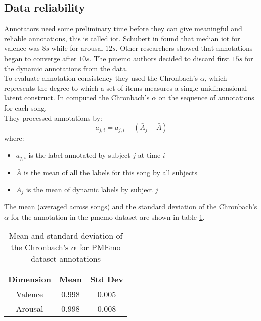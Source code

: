 \subsection{Data reliability}
Annotators need some preliminary time before they can give meaningful and reliable annotations, this is called \gls{iot}. Schubert in \cite{schubert2013reliability} found that median \gls{iot} for valence was $8s$ while for arousal $12s$. Other researchers showed that annotations began to converge after $10s$. The \gls{pmemo} authors decided to discard first $15s$ for the dynamic annotations from the data.
\\ \indent
To evaluate annotation consistency they used the Chronbach's $\alpha$, which represents the degree to which a set of items measures a single unidimensional latent construct. In \cite{zhang2018pmemo} computed the Chronbach's $\alpha$ on the sequence of annotations for each song.
\\
They processed annotations by:
\begin{equation}
	a_{j,i}=a_{j,i}+(\bar{A}_j-\bar{A})
\end{equation}
where:
\begin{itemize}
	\item $a_{j,i}$ is the label annotated by subject $j$ at time $i$
	\item $\bar{A}$ is the mean of all the labels for this song by all subjects
	\item $\bar{A}_j$ is the mean of dynamic labels by subject $j$
\end{itemize}
The mean (averaged across songs) and the standard deviation of the Chronbach's $\alpha$ for the annotation in the \gls{pmemo} dataset are shown in table \ref{table:Chronbach}.
\begin{table}[h!]
	\centering
	\begin{tabular}{|c|c|c|}
		\hline
		Dimension & Mean & Std Dev \\ [0.5ex] 
		\hline\hline Valence & 0.998 & 0.005 \\ 
		\hline Arousal & 0.998 & 0.008 \\ 
		\hline
	\end{tabular}
	\caption{Mean and standard deviation of the Chronbach's $\alpha$ for PMEmo dataset annotations}
	\label{table:Chronbach}
\end{table}

